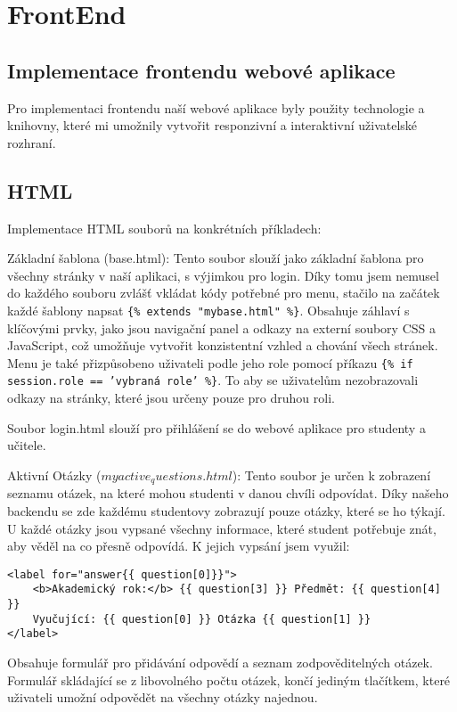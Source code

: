 \documentclass[11pt,a4paper,twoside,openright]{report}
\begin{document}
\chapter{FrontEnd}
\section{Implementace frontendu webové aplikace}
Pro implementaci frontendu naší webové aplikace byly použity technologie a knihovny, které mi umožnily vytvořit responzivní a interaktivní uživatelské rozhraní.

\section{HTML}
Implementace HTML souborů na konkrétních příkladech:

Základní šablona (base.html): Tento soubor slouží jako základní šablona pro všechny stránky v naší aplikaci, s výjimkou pro login. Díky tomu jsem nemusel do každého souboru zvlášť vkládat kódy potřebné pro menu, stačilo na začátek každé šablony napsat \texttt{\{\% extends "mybase.html" \%\}}. Obsahuje záhlaví s klíčovými prvky, jako jsou navigační panel a odkazy na externí soubory CSS a JavaScript, což umožňuje vytvořit konzistentní vzhled a chování všech stránek. Menu je také přizpůsobeno uživateli podle jeho role pomocí příkazu \texttt{\{\% if session.role == 'vybraná role' \%\}}. To aby se uživatelům nezobrazovali odkazy na stránky, které jsou určeny pouze pro druhou roli.

Soubor login.html slouží pro přihlášení se do webové aplikace pro studenty a učitele.

Aktivní Otázky ($myactive_questions.html$): Tento soubor je určen k zobrazení seznamu otázek, na které mohou studenti v danou chvíli odpovídat. Díky našeho backendu se zde každému studentovy zobrazují pouze otázky, které se ho týkají. U každé otázky jsou vypsané všechny informace, které student potřebuje znát, aby věděl na co přesně odpovídá. K jejich vypsání jsem využil: 
\begin{verbatim}
<label for="answer{{ question[0]}}">
    <b>Akademický rok:</b> {{ question[3] }} Předmět: {{ question[4] }} 
    Vyučující: {{ question[0] }} Otázka {{ question[1] }}
</label>
\end{verbatim}
Obsahuje formulář pro přidávání odpovědí a seznam zodpověditelných otázek. Formulář skládající se z libovolného počtu otázek, končí jediným tlačítkem, které uživateli umožní odpovědět na všechny otázky najednou.
\end{document}
